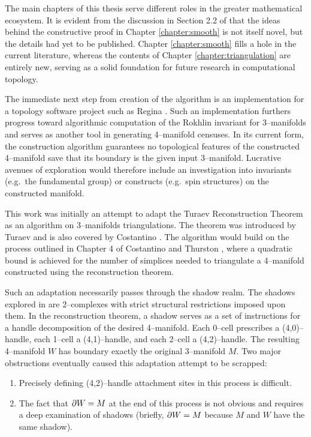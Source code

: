 \label{chapter:conclusion}

The main chapters of this thesis serve different roles in the greater mathematical ecosystem.
It is evident from the discussion in Section 2.2 of \cite{CostThur08} that the ideas behind the constructive proof in Chapter \ref{chapter:smooth} is not itself novel, but the details had yet to be published.
Chapter \ref{chapter:smooth} fills a hole in the current literature, whereas the contents of Chapter \ref{chapter:triangulation} are entirely new, serving as a solid foundation for future research in computational topology.

The immediate next step from creation of the algorithm is an implementation for a topology software project such as Regina \cite{regina}.
Such an implementation furthers progress toward algorithmic computation of the Rokhlin invariant for 3--manifolds and serves as another tool in generating 4--manifold censuses.
In its current form, the construction algorithm guarantees no topological features of the constructed 4--manifold save that its boundary is the given input 3--manifold.
Lucrative avenues of exploration would therefore include an investigation into invariants (e.g.\ the fundamental group) or constructs (e.g.\ spin structures) on the constructed manifold.

This work was initially an attempt to adapt the Turaev Reconstruction Theorem as an algorithm on 3--manifolds triangulations.
The theorem was introduced by Turaev \cite{Turaev91} and is also covered by Costantino \cite{Cost05}.
The algorithm would build on the process outlined in Chapter 4 of Costantino and Thurston \cite{CostThur08}, where a quadratic bound is achieved for the number of simplices needed to triangulate a 4--manifold constructed using the reconstruction theorem.

Such an adaptation necessarily passes through the shadow realm.
The shadows explored in \cite{Turaev91} are 2--complexes with strict structural restrictions imposed upon them.
In the reconstruction theorem, a shadow serves as a set of instructions for a handle decomposition of the desired 4--manifold.
Each 0--cell prescribes a (4,0)--handle, each 1--cell a (4,1)--handle, and each 2--cell a (4,2)--handle.
The resulting 4--manifold $W$ has boundary exactly the original 3--manifold $M$.
Two major obstructions eventually caused this adaptation attempt to be scrapped:
\begin{enumerate}
	\item Precisely defining (4,2)--handle attachment sites in this process is difficult.
	\item The fact that $\partial W = M$ at the end of this process is not obvious and requires a deep examination of shadows (briefly, $\partial W = M$ because $M$ and $W$ have the same shadow).
\end{enumerate}

